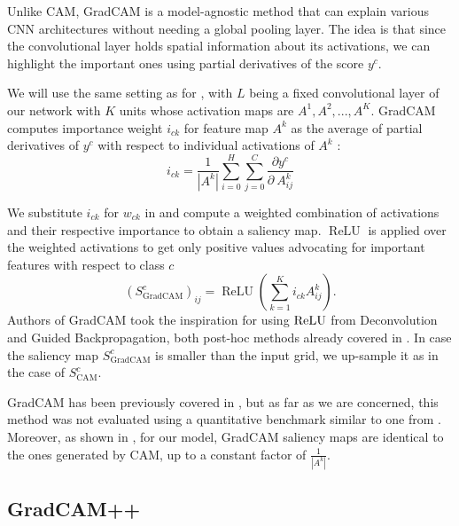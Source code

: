 Unlike CAM, GradCAM \cite{grad-cam} is a model-agnostic method that can explain various CNN architectures without needing a global pooling layer.
The idea is that since the convolutional layer holds spatial information about its activations, we can highlight the important ones using partial derivatives of the score $y^c$.

We will use the same setting as for , with $L$ being a fixed convolutional layer of our network with $K$ units whose activation maps are $A^1, A^2, ..., A^K$.
GradCAM computes importance weight $i_{ck}$ for feature map $A^k$ as the average of partial derivatives of $y^c$ with respect to individual activations of $A^k$ \cite{grad-cam}:
\begin{equation}\label{grad-cam-weights}
    i_{ck} = \frac{1}{|A^k|} \sum_{i=0}^H \sum_{j=0}^C \frac{\partial y^c}{\partial\ A^k_{ij}}
\end{equation}

We substitute $i_{ck}$ for $w_{ck}$ in  and compute a weighted combination of activations and their respective importance to obtain a saliency map.
$\operatorname{ReLU}$ is applied over the weighted activations to get only positive values advocating for important features with respect to class $c$ \cite{grad-cam}
\begin{equation}
    (S^c_{\text{GradCAM}})_{ij} = \operatorname{ReLU}(\sum_{k=1}^K i_{ck} A^k_{ij}).
\end{equation}
Authors of GradCAM took the inspiration for using $\operatorname{ReLU}$ from Deconvolution and Guided Backpropagation, both post-hoc methods already covered in \cite{gallo}.
In case the saliency map $S^c_{\text{GradCAM}}$ is smaller than the input grid, we up-sample it as in the case of $S^c_{\text{CAM}}$.

GradCAM has been previously covered in \cite{hruska-grad-cam, krajnansky-grad-cam, bajger-grad-cam}, but as far as we are concerned, this method was not evaluated using a quantitative benchmark similar to one from \cite{gallo}. Moreover, as shown in \cite{bajger-grad-cam}, for our model, GradCAM saliency maps are identical to the ones generated by CAM, up to a constant factor of $\frac{1}{|A^k|}$.

\subsection{GradCAM++}

